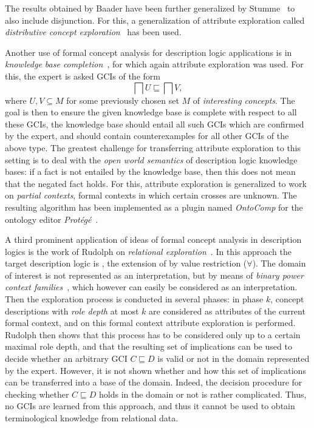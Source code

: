 The results obtained by Baader have been further generalized by
Stumme~\cite{stumme96concept} to also include disjunction.  For this, a generalization of
attribute exploration called \emph{distributive concept
  exploration}~\cite{conf/ki/Stumme98} has been used.

Another use of formal concept analysis for description logic applications is in
\emph{knowledge base completion}~\cite{Sert07,conf/ijcai/BaaderGSS07}, for which again
attribute exploration was used.  For this, the expert is asked GCIs of the form
\begin{equation*}
  \bigsqcap U \sqsubseteq \bigsqcap V,
\end{equation*}
where $U, V \subseteq M$ for some previously chosen set $M$ of \emph{interesting
  concepts}.  The goal is then to ensure the given knowledge base is complete with respect
to all these GCIs, \ie the knowledge base should entail all such GCIs which are confirmed
by the expert, and should contain counterexamples for all other GCIs of the above type.
The greatest challenge for transferring attribute exploration to this setting is to deal
with the \emph{open world semantics} of description logic knowledge bases: if a fact is
not entailed by the knowledge base, then this does not mean that the negated fact holds.
For this, attribute exploration is generalized to work on \emph{partial contexts}, \ie
formal contexts in which certain crosses are unknown.  The resulting algorithm has been
implemented as a plugin named \emph{OntoComp} for the ontology editor
\emph{Protégé}~\cite{conf/esws/Sertkaya09}.

A third prominent application of ideas of formal concept analysis in description logics is
the work of Rudolph on \emph{relational
  exploration}~\cite{phd/de/Rudolph2006,conf/iccs/Rudolph04}.  In this approach the target
description logic is \FLE, the extension of \EL by value restriction ($\forall$).  The
domain of interest is not represented as an interpretation, but by means of \emph{binary
  power context families}~\cite{DBLP:conf/iccs/PredigerW99}, which however can easily be
considered as an interpretation.  Then the exploration process is conducted in several
phases: in phase $k$, concept descriptions with \emph{role depth} at most $k$ are
considered as attributes of the current formal context, and on this formal context
attribute exploration is performed.  Rudolph then shows that this process has to be
considered only up to a certain maximal role depth, and that the resulting set of
implications can be used to decide whether an arbitrary GCI $C \sqsubseteq D$ is valid or
not in the domain represented by the expert.  However, it is not shown whether and how
this set of implications can be transferred into a base of the domain.  Indeed, the
decision procedure for checking whether $C \sqsubseteq D$ holds in the domain or not is
rather complicated.  Thus, no GCIs are learned from this approach, and thus it cannot be
used to obtain terminological knowledge from relational data.

